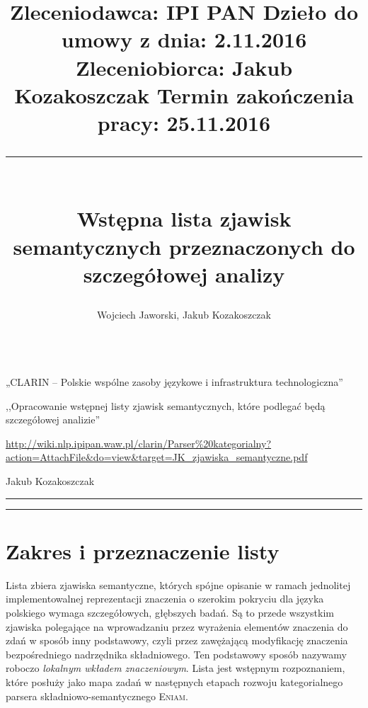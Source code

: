 \documentclass[a4paper, 12pt]{article}
\title{
\normalsize
\setlength{\topsep}{0pt} 
\noindent
Zleceniodawca: IPI PAN \hfill Dzieło do umowy z dnia: 2.11.2016 \\
Zleceniobiorca: Jakub Kozakoszczak \hfill Termin zakończenia pracy: 25.11.2016 \\
\rule{\linewidth}{2pt} \\[6pt] 
\huge Wstępna lista zjawisk semantycznych przeznaczonych do szczegółowej analizy \\[-2pt]}
\author{\Large Wojciech Jaworski, Jakub Kozakoszczak\\[6pt]
\hspace{-5pt}\rule{\linewidth}{2pt}  }
\date{}
\theoremstyle{remark}
\newcommand{\eniam}{\textsc{Eniam}}
\begin{document}
\maketitle
		
\vspace{-26pt}
\begin{description}
\setlength{\itemsep}{4pt} 
\setlength{\parskip}{0pt} 
	\item[Zrealizowane w ramach projektu:] „CLARIN -- Polskie wspólne zasoby językowe i infrastruktura technologiczna”
	\item[Tytuł pracy zamówionej:] ,,Opracowanie wstępnej listy zjawisk semantycznych, które podlegać będą szczegółowej analizie''
	\item[Adres dzieła:] \url{http://wiki.nlp.ipipan.waw.pl/clarin/Parser\%20kategorialny?action=AttachFile\&do=view\&target=JK_zjawiska_semantyczne.pdf}
	\item[Opracowanie dokumentu:] Jakub Kozakoszczak
\end{description}

\vspace{6pt}
\hrule
\vspace{-14pt}
\renewcommand\contentsname{\normalsize{}}
\tableofcontents
\vspace{20pt}
\hrule
\newpage

\linenumbers
\section{Zakres i przeznaczenie listy} %
Lista zbiera zjawiska semantyczne, których spójne opisanie w ramach jednolitej implementowalnej reprezentacji znaczenia o szerokim pokryciu dla języka polskiego wymaga szczegółowych, głębszych badań.
 Są to przede wszystkim zjawiska polegające na wprowadzaniu przez wyrażenia elementów znaczenia do zdań w sposób inny podstawowy, czyli przez zawężającą modyfikację znaczenia bezpośredniego nadrzędnika składniowego.
Ten podstawowy sposób nazywamy roboczo \emph{lokalnym wkładem znaczeniowym}.
Lista jest wstępnym rozpoznaniem, które posłuży jako mapa zadań w następnych etapach rozwoju kategorialnego parsera składniowo-semantycznego \eniam.


\end{document}
